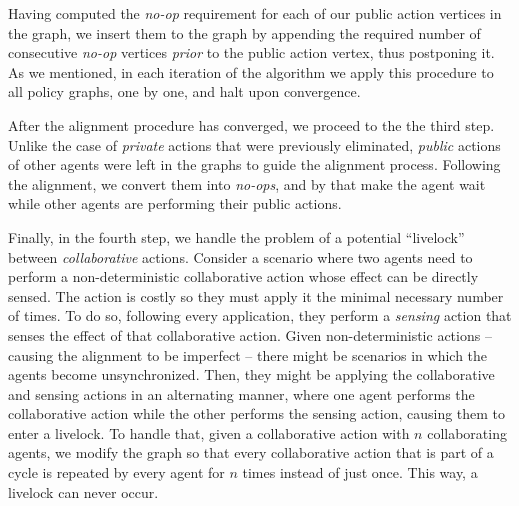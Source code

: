 \documentclass[letterpaper]{article} %
\newcommand{\eliran}[1]{\textbf{[\color{red}ELIRAN:#1]}}
\begin{document}
Having computed the  {\em no-op} requirement for each of our public action vertices in the graph, we insert them to the graph by appending the required number of consecutive  {\em no-op} vertices \emph{prior} to the public action vertex, thus postponing it.
As we mentioned, in each iteration of the algorithm we apply this procedure to all policy graphs, one by one, and halt upon convergence.

After the alignment procedure has converged, we proceed to the the third step. Unlike the case of \emph{private} actions that were previously eliminated, \emph{public} actions of other agents were left in the graphs to guide the alignment process. Following the alignment, we convert them into \emph{no-ops}, and by that make the agent wait while other agents are performing their public actions.

Finally, in the fourth step, we handle the problem of a potential ``livelock''
between \emph{collaborative} actions. Consider a scenario where two agents need to perform a non-deterministic collaborative action whose effect can be directly sensed. The action is costly so they must apply it the minimal necessary number of times. To do so, following every application, they perform a \emph{sensing} action that senses the effect of that collaborative action.
Given non-deterministic actions -- causing the alignment to be imperfect -- there might be scenarios in which the agents become unsynchronized. Then, they might be applying the collaborative and sensing actions in an alternating manner, where one agent performs the collaborative action while the other performs the sensing action, causing them to enter a livelock. To handle that, given a collaborative action with $n$ collaborating agents, we modify the graph so that every collaborative action that is part of a cycle is repeated by every agent for $n$ times instead of just once. This way, a livelock can never occur.

\end{document}
